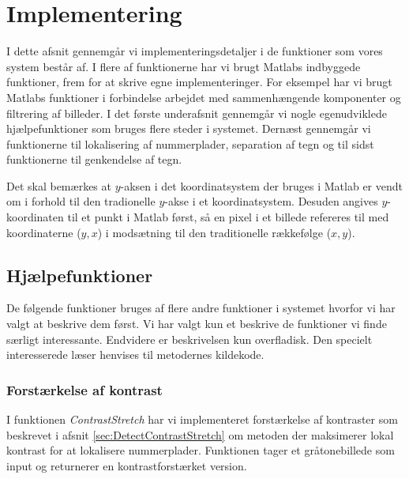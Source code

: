 \section{Implementering}
\label{sec:implementation}

I dette afsnit gennemgår vi implementeringsdetaljer i de funktioner som vores system består af. I flere af funktionerne har vi brugt Matlabs indbyggede funktioner, frem for at skrive egne implementeringer. For eksempel har vi brugt Matlabs funktioner i forbindelse arbejdet med sammenhængende komponenter og filtrering af billeder. I det første underafsnit gennemgår vi nogle egenudviklede hjælpefunktioner som bruges flere steder i systemet. Dernæst gennemgår vi funktionerne til lokalisering af nummerplader, separation af tegn og til sidst funktionerne til genkendelse af tegn.

Det skal bemærkes at $y$-aksen i det koordinatsystem der bruges i Matlab er vendt om i forhold til den tradionelle $y$-akse i et koordinatsystem. Desuden angives $y$-koordinaten til et punkt i Matlab først, så en pixel i et billede refereres til med koordinaterne ($y,x$) i modsætning til den traditionelle rækkefølge ($x,y$).




\subsection{Hjælpefunktioner}
\label{sec:imp:hjaelpefunktioner}
De følgende funktioner bruges af flere andre funktioner i systemet hvorfor vi har valgt at beskrive dem først. Vi har valgt kun et beskrive de funktioner vi finde særligt interessante. Endvidere er beskrivelsen kun overfladisk. Den specielt interesserede læser henvises til metodernes kildekode.

\subsubsection{Forstærkelse af kontrast}
\label{sec:imp:ContrastStrech}
I funktionen \textit{ContrastStretch} har vi implementeret forstærkelse af kontraster som beskrevet i afsnit \vref{sec:DetectContrastStretch} om metoden der maksimerer lokal kontrast for at lokalisere nummerplader. Funktionen tager et gråtonebillede som input og returnerer en kontrastforstærket version. 

